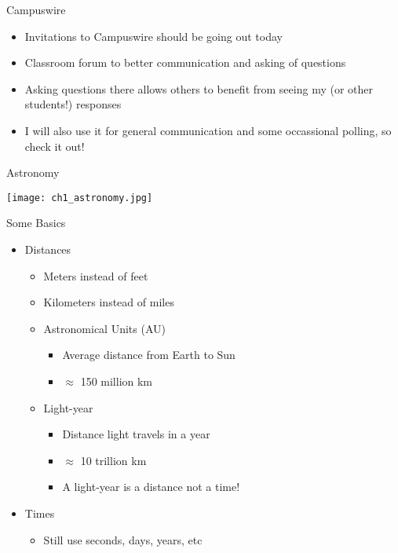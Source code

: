 \documentclass[pdf,aspectratio=169]{beamer}
\begin{document}
\begin{frame}{Campuswire}
	\begin{itemize}
		\item Invitations to Campuswire should be going out today
		\item Classroom forum to better communication and asking of questions
		\item Asking questions there allows others to benefit from seeing my (or other students!) responses
		\item I will also use it for general communication and some occassional polling, so check it out!
	\end{itemize}
\end{frame}

\begin{frame}{Astronomy}
  \begin{center}
	\texttt{[image: ch1\_astronomy.jpg]}
  \end{center}
\end{frame}


\begin{frame}{Some Basics}
  \begin{itemize}
	\item Distances
	  \begin{itemize}
		\item Meters instead of feet
		\item Kilometers instead of miles
		\item Astronomical Units (AU)
		  \begin{itemize}
			\item Average distance from Earth to Sun
			\item $\approx$ 150 million km
		  \end{itemize}
		\item Light-year
		  \begin{itemize}
			\item Distance light travels in a year
			\item $\approx$ 10 trillion km
			\item A light-year is a \alert{distance} not a time!
		  \end{itemize}
	  \end{itemize}
	\item Times
	  \begin{itemize}
		\item Still use seconds, days, years, etc
	  \end{itemize}
  \end{itemize}
\end{frame}
\end{document}
